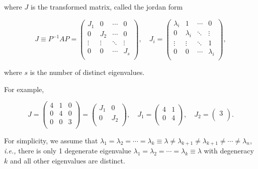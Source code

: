 \documentclass[english,a4paper,12pt]{report}
\begin{document}
where \(J\) is the transformed matrix, called the jordan form 

\begin{equation}
    J \equiv  P^{-1} AP = \begin{pmatrix}
        J_1  & 0 & \cdots  & 0  \\
        0 & J_2  & \cdots  & 0  \\
        \vdots  & \vdots  & \ddots  & \vdots   \\
        0 & 0 & \cdots  & J_{s}   \\
    \end{pmatrix}, \quad     J_{i} = \begin{pmatrix}
        \lambda _{i}  & 1 & \cdots  & 0  \\
        0 & \lambda _{i}  & \ddots  & \vdots   \\
        \vdots  & \vdots  & \ddots & 1  \\
        0 & 0 & \cdots  & \lambda _{i}  \\
    \end{pmatrix},
\end{equation}

where \(s\) is the number of distinct eigenvalues.

For example, 

\begin{equation}
    J = \begin{pmatrix}
        4 & 1 &  0 \\
        0 & 4 &  0 \\
        0 & 0 &  3 \\
    \end{pmatrix} = \begin{pmatrix}
        J_1  & 0  \\
        0 & J_2   \\
    \end{pmatrix}, \quad J_1 = \begin{pmatrix}
        4 &  1 \\
        0 &  4 \\
    \end{pmatrix}, \quad J_2 = \begin{pmatrix}
         3 \\
    \end{pmatrix}.
\end{equation}

For simplicity, we assume that \(\lambda _{1} = \lambda _{2} = \cdots = \lambda _{k} \equiv \lambda  \neq \lambda _{k+1} \neq \lambda _{k+1} \neq \cdots \neq \lambda _{n} \), \textit{i.e.,} there is only 1 degenerate eigenvalue \(\lambda _{1} = \lambda _{2} = \cdots = \lambda _{k}  \equiv \lambda  \) with degeneracy \(k\) and all other eigenvalues are distinct.
\end{document}
